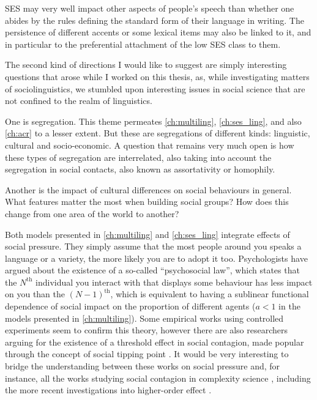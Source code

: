 \documentclass[../thesis.tex]{subfiles}
\begin{document}
\Ac{SES} may very well impact other aspects of people's speech than whether one abides
by the rules defining the standard form of their language in writing. The persistence of
different accents or some lexical items may also be linked to it, and in particular to
the preferential attachment of the low \ac{SES} class to them. 

The second kind of directions I would like to suggest are simply interesting questions
that arose while I worked on this thesis, as, while investigating matters of
sociolinguistics, we stumbled upon interesting issues in social science that are not
confined to the realm of linguistics.

One is segregation. This theme permeates \cref{ch:multiling},
\cref{ch:ses_ling}, and also \cref{ch:acr} to a lesser extent. But these are
segregations of different kinds: linguistic, cultural and socio-economic. A question
that remains very much open is how these types of segregation are interrelated, also
taking into account the segregation in social contacts, also known as assortativity or
homophily.

Another is the impact of cultural differences on social behaviours in general. What
features matter the most when building social groups? How does this change from one area
of the world to another?

Both models presented in \cref{ch:multiling} and \cref{ch:ses_ling} integrate effects of
social pressure. They simply assume that the most people around you speaks a language or
a variety, the more likely you are to adopt it too. Psychologists have argued about the
existence of a so-called ``psychosocial law'', which states that the $N^\text{th}$
individual you interact with that displays some behaviour has less impact on you than
the $(N - 1)^\text{th}$, which is equivalent to having a sublinear functional dependence
of social impact on the proportion of different agents ($a < 1$ in the models presented
in \cref{ch:multiling}). Some empirical works using controlled experiments seem to
confirm this theory, however there are also researchers arguing for the existence of a
threshold effect in social contagion, made popular through the concept of social tipping
point \cite{MilkoreitDefiningTipping2018}. It would be very interesting to bridge the
understanding between these works on social pressure and, for instance, all the works
studying social contagion in complexity science \cite{WattsInfluentialsNetworks2007},
including the more recent investigations into higher-order effect
\cite{IacopiniSimplicialModels2019}.
\end{document}
